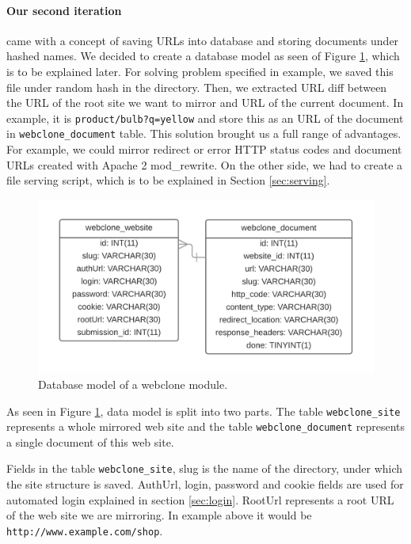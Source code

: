 \paragraph{Our second iteration} came with a concept of saving URLs into database and storing documents under hashed names. We decided to create a database model as seen of Figure \ref{webclonemodel}, which is to be explained later. For solving problem specified in example, we saved this file under random hash in the directory. Then, we extracted URL diff between the URL of the root site we want to mirror and URL of the current document. In example, it is \texttt{product/bulb?q=yellow} and store this as an URL of the document in \texttt{webclone\_document} table. This solution brought us a full range of advantages. For example, we could mirror redirect or error HTTP status codes and document URLs created with Apache 2 mod\_rewrite. On the other side, we had to create a file serving script, which is to be explained in Section \ref{sec:serving}.

\begin{figure}[h]
    \centering
    \includegraphics[width=\textwidth]{images/databaseWebclone.png}
    \caption{Database model of a webclone module.}
    \label{webclonemodel}
\end{figure}

As seen in Figure \ref{webclonemodel}, data model is split into two parts. The table \texttt{webclone\_site} represents a whole mirrored web site and the table \texttt{webclone\_document} represents a single document of this web site.

Fields in the table \texttt{webclone\_site}, slug is the name of the directory, under which the site structure is saved. AuthUrl, login, password and cookie fields are used for automated login explained in section \ref{sec:login}. RootUrl represents a root URL of the web site we are mirroring. In example above it would be \texttt{http://www.example.com/shop}.

